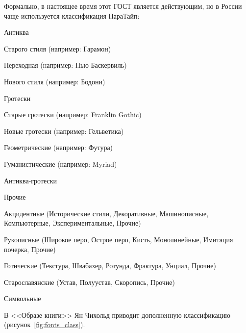 Формально, в настоящее время этот ГОСТ является действующим, но в России чаще используется классификация ПараТайп:

\begin{enumerate*}
	\item Антиква
	\begin{enumerate*}
		\item Старого стиля (например: Гарамон)
		\item Переходная (например: Нью Баскервиль)
		\item Нового стиля (например: Бодони)
	\end{enumerate*}
	\item Гротески
	\begin{enumerate*}
		\item Старые гротески (например: Franklin Gothic)
		\item Новые гротески (например: Гельветика)
		\item Геометрические (например: Футура)
		\item Гуманистические (например: Myriad)
		\item Антиква-гротески
		\item Прочие
	\end{enumerate*}
	\item Акцидентные (Исторические стили, Декоративные, Машинописные, Компьютерные, Экспериментальные, Прочие)
	\item Рукописные (Широкое перо, Острое перо, Кисть, Монолинейные, Имитация почерка, Прочие)
	\item Готические (Текстура, Швабахер, Ротунда, Фрактура, Унциал, Прочие)
	\item Старославянские (Устав, Полуустав, Скоропись, Прочие)
	\item Символьные
\end{enumerate*}

В <<Образе книги>> Ян Чихольд приводит дополненную классификацию (рисунок~\ref{fig:fonts_class}).

